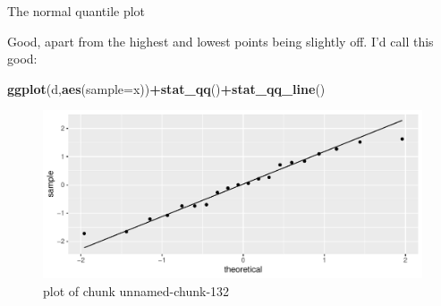 \documentclass[ignorenonframetext,]{beamer}
\newenvironment{Shaded}{\begin{snugshade}}{\end{snugshade}}
\newcommand{\DataTypeTok}[1]{\textcolor[rgb]{0.13,0.29,0.53}{#1}}
\newcommand{\KeywordTok}[1]{\textcolor[rgb]{0.13,0.29,0.53}{\textbf{#1}}}
\newcommand{\NormalTok}[1]{#1}
\newcommand{\OperatorTok}[1]{\textcolor[rgb]{0.81,0.36,0.00}{\textbf{#1}}}
\begin{document}
\begin{frame}[fragile]{The normal quantile plot}
\protect\hypertarget{the-normal-quantile-plot-2}{}

Good, apart from the highest and lowest points being slightly off. I'd
call this good:

\begin{Shaded}
\begin{Highlighting}[]
\KeywordTok{ggplot}\NormalTok{(d,}\KeywordTok{aes}\NormalTok{(}\DataTypeTok{sample=}\NormalTok{x))}\OperatorTok{+}\KeywordTok{stat_qq}\NormalTok{()}\OperatorTok{+}\KeywordTok{stat_qq_line}\NormalTok{()}
\end{Highlighting}
\end{Shaded}

\begin{figure}
\centering
\includegraphics{figure/unnamed-chunk-132-1.pdf}
\caption{plot of chunk unnamed-chunk-132}
\end{figure}

\end{frame}
\end{document}
